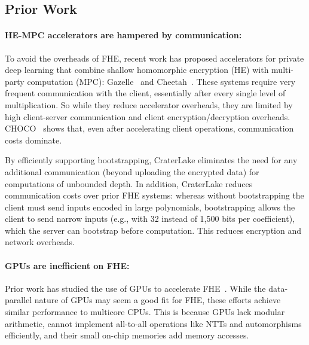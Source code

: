 \subsection{Prior Work}

\paragraph{HE-MPC accelerators are hampered by communication:} To avoid the
overheads of FHE, recent work has proposed accelerators for private deep
learning that combine shallow homomorphic encryption (HE) with multi-party
computation (MPC): Gazelle~\cite{juvekar2018gazelle} and
Cheetah~\cite{reagen:hpca21:cheetah}. These systems require very frequent
communication with the client, essentially after every single level of
multiplication. So while they reduce accelerator overheads, they are limited by
high client-server communication and client encryption/decryption overheads.
CHOCO~\cite{vanderhagen:arxiv21:choco} shows that, even after accelerating
client operations, communication costs dominate.

By efficiently supporting bootstrapping, CraterLake eliminates the need for any
additional communication (beyond uploading the encrypted data) for computations
of unbounded depth. In addition, CraterLake  reduces communication costs over prior
FHE systems: whereas without bootstrapping the client must send inputs encoded
in large polynomials, bootstrapping allows the client to send narrow inputs
(e.g., with 32 instead of 1,500 bits per coefficient), which the server can
bootstrap before computation. This reduces encryption and network overheads.

\paragraph{GPUs are inefficient on FHE:} Prior work has studied the use of GPUs
to accelerate
FHE~\cite{wang:hpec12:fhe-gpu,wang:tc13:fhe-gpu,wang:iscas14:leveled-gpu,al:emerging19:implementation}.
While the data-parallel nature of GPUs may seem a good fit for FHE, these
efforts achieve similar performance to multicore CPUs. This is because GPUs
lack modular arithmetic, cannot implement all-to-all operations like NTTs and
automorphisms efficiently, and their small on-chip memories add memory
accesses.
